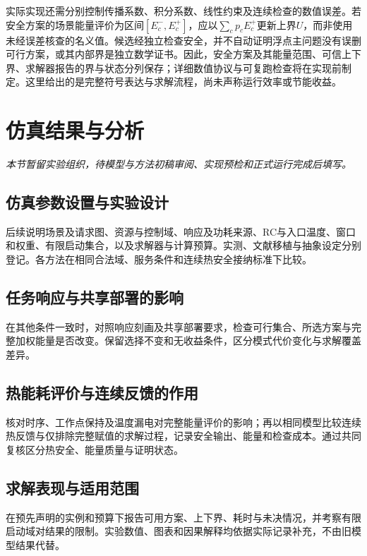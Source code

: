 实际实现还需分别控制传播系数、积分系数、线性约束及连续检查的数值误差。若安全方案的场景能量评价为区间\([E_c^-,E_c^+]\)，应以\(\sum_cp_cE_c^+\)更新上界\(U\)，而非使用未经误差核查的名义值。候选经独立检查安全，并不自动证明浮点主问题没有误删可行方案，或其内部界是独立数学证书。因此，安全方案及其能量范围、可信上下界、求解器报告的界与状态分列保存；详细数值协议与可复跑检查将在实现前制定。这里给出的是完整符号表达与求解流程，尚未声称运行效率或节能收益。

\section{仿真结果与分析}
\label{sec:experiments-pending}

\textit{本节暂留实验组织，待模型与方法初稿审阅、实现预检和正式运行完成后填写。}

\subsection{仿真参数设置与实验设计}

后续说明场景及请求图、资源与控制域、响应及功耗来源、RC与入口温度、窗口和权重、有限启动集合，以及求解器与计算预算。实测、文献移植与抽象设定分别登记。各方法在相同合法域、服务条件和连续热安全接纳标准下比较。

\subsection{任务响应与共享部署的影响}

在其他条件一致时，对照响应刻画及共享部署要求，检查可行集合、所选方案与完整加权能量是否改变。保留选择不变和无收益条件，区分模式代价变化与求解覆盖差异。

\subsection{热能耗评价与连续反馈的作用}

核对时序、工作点保持及温度漏电对完整能量评价的影响；再以相同模型比较连续热反馈与仅排除完整赋值的求解过程，记录安全输出、能量和检查成本。通过共同复核区分热安全、能量质量与证明状态。

\subsection{求解表现与适用范围}

在预先声明的实例和预算下报告可用方案、上下界、耗时与未决情况，并考察有限启动域对结果的限制。实验数值、图表和因果解释均依据实际记录补充，不由旧模型结果代替。

